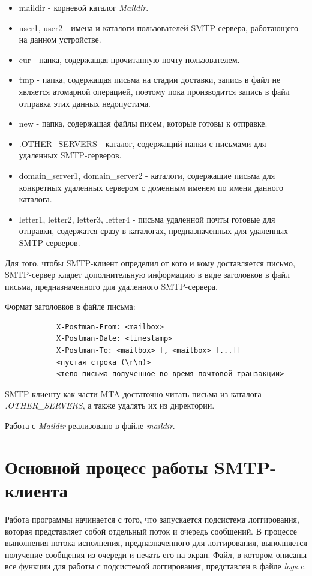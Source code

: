 \documentclass[a4paper,12pt]{report}
\begin{document}
	\begin{itemize}
		\item maildir - корневой каталог \textit{Maildir}.
		\item user1, user2 - имена и каталоги пользователей SMTP-сервера, работающего на данном устройстве.
		\item cur - папка, содержащая прочитанную почту пользователем.
		\item tmp - папка, содержащая письма на стадии доставки, запись в файл не является атомарной операцией, поэтому пока производится запись в файл отправка этих данных недопустима.
		\item new - папка, содержащая файлы писем, которые готовы к отправке.
		\item .OTHER\_SERVERS - каталог, содержащий папки с письмами для удаленных SMTP-серверов.
		\item domain\_server1, domain\_server2 - каталоги, содержащие письма для конкретных удаленных сервером с доменным именем по имени данного каталога.
		\item letter1, letter2, letter3, letter4 - письма удаленной почты готовые для отправки, содержатся сразу в каталогах, предназначенных для удаленных SMTP-серверов.
	\end{itemize}

	Для того, чтобы SMTP-клиент определил от кого и кому доставляется письмо, SMTP-сервер кладет дополнительную информацию в виде заголовков в файл письма, предназначенного для удаленного SMTP-сервера.
	
	Формат заголовков в файле письма:
	\begin{verbatim}
        	X-Postman-From: <mailbox>
        	X-Postman-Date: <timestamp>
        	X-Postman-To: <mailbox> [, <mailbox> [...]]
        	<пустая строка (\r\n)>
        	<тело письма полученное во время почтовой транзакции>
    	\end{verbatim}
    
	SMTP-клиенту как части MTA достаточно читать письма из каталога \textit{.OTHER\_SERVERS}, а также удалять их из директории.

    	Работа с \textit{Maildir} реализовано в файле \textit{maildir}.

	\section{Основной процесс работы SMTP-клиента}

	Работа программы начинается с того, что запускается подсистема логгирования, которая представляет собой отдельный поток и очередь сообщений. В процессе выполнения потока исполнения, предназначенного для логгирования, выполняется получение сообщения из очереди и печать его на экран. Файл, в котором описаны все функции для работы с подсистемой логгирования, представлен в файле \textit{logs.c}.
\end{document}
